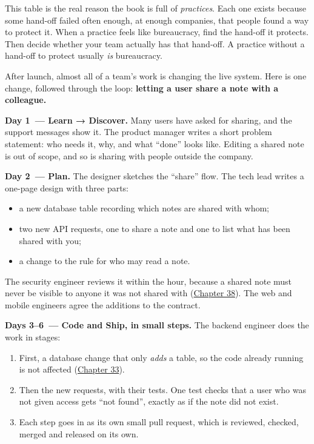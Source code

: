 This table is the real reason the book is full of \emph{practices}. Each one exists because some hand-off failed often enough, at enough companies, that people found a way to protect it. When a practice feels like bureaucracy, find the hand-off it protects. Then decide whether your team actually has that hand-off. A practice without a hand-off to protect usually \emph{is} bureaucracy.

\label{the-same-process-in-a-team:a-change-to-a-live-system}

After launch, almost all of a team's work is changing the live system. Here is one change, followed through the loop: \textbf{letting a user share a note with a colleague.}

\textbf{Day 1~--- Learn → Discover.} Many users have asked for sharing, and the support messages show it. The product manager writes a short problem statement: who needs it, why, and what ``done'' looks like. Editing a shared note is out of scope, and so is sharing with people outside the company.

\textbf{Day 2~--- Plan.} The designer sketches the ``share'' flow. The tech lead writes a one-page design with three parts:

\begin{itemize}
\tightlist
\item
  a new database table recording which notes are shared with whom;
\item
  two new API requests, one to share a note and one to list what has been shared with you;
\item
  a change to the rule for who may read a note.
\end{itemize}

\noindent{}The security engineer reviews it within the hour, because a shared note must never be visible to anyone it was not shared with (\hyperref[ch:38-security]{Chapter 38}). The web and mobile engineers agree the additions to the contract.

\textbf{Days 3--6~--- Code and Ship, in small steps.} The backend engineer does the work in stages:

\begin{enumerate}
\def\labelenumi{\arabic{enumi}.}
\tightlist
\item
  First, a database change that only \emph{adds} a table, so the code already running is not affected (\hyperref[ch:33-logic-execution]{Chapter 33}).
\item
  Then the new requests, with their tests. One test checks that a user who was not given access gets ``not found'', exactly as if the note did not exist.
\item
  Each step goes in as its own small pull request, which is reviewed, checked, merged and released on its own.
\end{enumerate}

